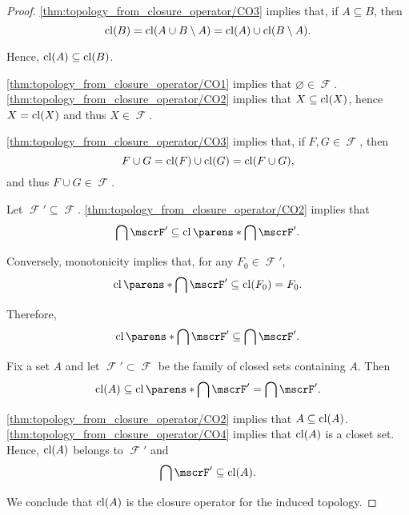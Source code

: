 \begin{proof}
   \ref{thm:topology_from_closure_operator/CO3} implies that, if \( A \subseteq B \), then
  \begin{equation*}
    \operatorname{cl}(B) = \operatorname{cl}(A \cup B \setminus A) = \operatorname{cl}(A) \cup \operatorname{cl}(B \setminus A).
  \end{equation*}

  Hence, \( \operatorname{cl}(A) \subseteq \operatorname{cl}(B) \).


   \ref{thm:topology_from_closure_operator/CO1} implies that \( \varnothing \in \mscrF \). \ref{thm:topology_from_closure_operator/CO2} implies that \( X \subseteq \operatorname{cl}(X) \), hence \( X = \operatorname{cl}(X) \) and thus \( X \in \mscrF \).

   \ref{thm:topology_from_closure_operator/CO3} implies that, if \( F, G \in \mscrF \), then
  \begin{equation*}
    F \cup G = \operatorname{cl}(F) \cup \operatorname{cl}(G) = \operatorname{cl}(F \cup G),
  \end{equation*}
  and thus \( F \cup G \in \mscrF \).

   Let \( \mscrF' \subseteq \mscrF \). \ref{thm:topology_from_closure_operator/CO2} implies that
  \begin{equation*}
    \bigcap \mscrF' \subseteq \cl\parens*{ \bigcap \mscrF' }.
  \end{equation*}

  Conversely, monotonicity implies that, for any \( F_0 \in \mscrF' \),
  \begin{equation*}
    \cl\parens*{ \bigcap \mscrF' }
    \subseteq
    \cl(F_0)
    =
    F_0.
  \end{equation*}

  Therefore,
  \begin{equation*}
    \cl\parens*{ \bigcap \mscrF' } \subseteq \bigcap \mscrF'.
  \end{equation*}

   Fix a set \( A \) and let \( \mscrF' \subset \mscrF \) be the family of closed sets containing \( A \). Then
  \begin{equation*}
    \cl(A) \subseteq \cl\parens*{ \bigcap \mscrF' } = \bigcap \mscrF'.
  \end{equation*}

  \ref{thm:topology_from_closure_operator/CO2} implies that \( A \subseteq \operatorname{cl}(A) \). \ref{thm:topology_from_closure_operator/CO4} implies that \( \operatorname{cl}(A) \) is a closet set. Hence, \( \operatorname{cl}(A) \) belongs to \( \mscrF' \) and
  \begin{equation*}
    \bigcap \mscrF' \subseteq \cl(A).
  \end{equation*}

  We conclude that \( \operatorname{cl}(A) \) is the closure operator for the induced topology.
\end{proof}

